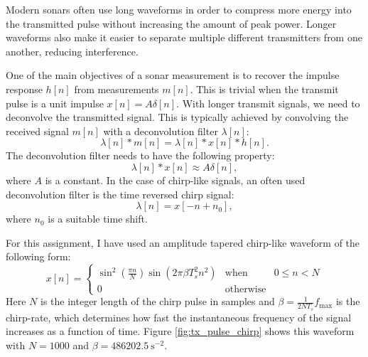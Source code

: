 Modern sonars often use long waveforms in order to compress more
energy into the transmitted pulse without increasing the amount of
peak power. Longer waveforms also make it easier to separate multiple
different transmitters from one another, reducing interference. 

One of the main objectives of a sonar measurement is to recover the impulse
response $h[n]$ from measurements $m[n]$. This is trivial when the
transmit pulse is a unit impulse $x[n]=A\delta[n]$. With longer
transmit signals, we need to deconvolve the transmitted signal. This
is typically achieved by convolving the received signal $m[n]$ with a deconvolution filter $\lambda[n]$:
\begin{equation}
  \lambda[n]*m[n] = \lambda[n] * x[n] * h[n].
\end{equation}
The deconvolution filter needs to have the following property:
\begin{equation}
  \lambda[n]*x[n] \approx A\delta[n],
\end{equation}
where $A$ is a constant. In the case of chirp-like signals, an often used deconvolution filter is the time reversed chirp signal:
\begin{equation}
  \lambda[n] = x[-n + n_0],
\end{equation}
where $n_0$ is a suitable time shift. 

For this assignment, I have used an amplitude tapered chirp-like waveform
of the following form:
\begin{equation}
  x[n] = \left\{
\begin{array}{ccc}
  \sin^2\left(\frac{\pi n}{N}\right) \sin(2\pi \beta T_s^2 n^2) & \mathrm{when} & 0 \le n < N\\
  0 & \mathrm{otherwise} & 
  \end{array}\right.
\end{equation}
Here $N$ is the integer length of the chirp pulse in samples and
$\beta = \frac{1}{2 N T_s}f_{\mathrm{max}}$ is the chirp-rate, which
determines how fast the instantaneous frequency of the signal
increases as a function of time. Figure \ref{fig:tx_pulse_chirp} shows
this waveform with $N=1000$ and $\beta = 486202.5\ \text{s}^{-2}$.     

